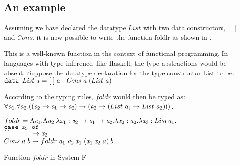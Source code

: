 \subsection{An example}
Assuming we have declared the datatype $List$ with two data constructors, $[\,]$ and $Cons$, it is now possible to write the function foldlr as shown in .

This is a well-known function in the context of functional programming. In languages with type inference, like Haskell, the type abstractions would be absent.
Suppose the datatype declaration for the type constructor List to be:\\
$\mathit{\texttt{data } List\; \mathit{a} = [\;]\;\mathit{a}\;|\;Cons \;\mathit{a}\;(\mathit{List}\;\mathit{a})}$

According to the typing rules, $foldr$ would then be typed as:\\
$\forall {\mathit{a}_1} . {\forall {\mathit{a}_2} . {((\mathit{a}_2 \rightarrow \mathit{a}_1 \rightarrow \mathit{a}_2)\rightarrow (\mathit{a}_2 \rightarrow (List\;\mathit{a}_1\rightarrow List\;\mathit{a}_2)))}}$.

\begin{eg}
  
  $foldr = \Lambda \mathit{a}_1 . \Lambda \mathit{a}_2 . \lambda \mathit{x}_1:\mathit{a}_2 \rightarrow \mathit{a}_1 \rightarrow \mathit{a}_2 . \lambda \mathit{x}_2 : \mathit{a}_2 . \lambda \mathit{x}_3 : List \, \mathit{a}_1 .$\\
  \phantom{foldl aaa}$\mathit{\texttt{case }} \mathit{x}_3 \mathit{\texttt{ of }}$\\
  \phantom{foldl aaaaa}$[\;] \phantom{ns a b iii}\rightarrow \mathit{x}_2$\\
  \phantom{foldl aaaaa}$Cons \; a \; b \rightarrow foldr \; \mathit{a}_1 \;\mathit{a}_2 \; \mathit{x}_1 \; (\mathit{x}_1 \; \mathit{x}_2 \; a)  \; b$
  
  
  \caption{Function $foldr$ in System F}
  \label{foldr}
\end{eg}


